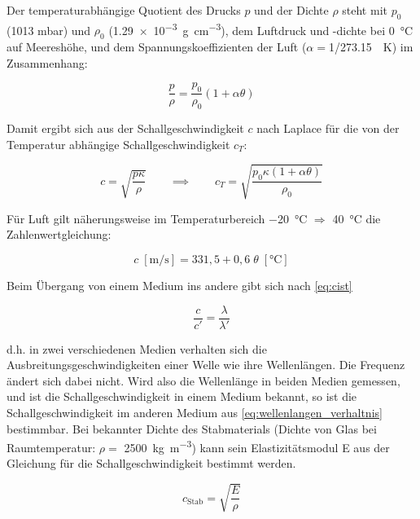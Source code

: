 \documentclass[11pt]{scrartcl}
\begin{document}
Der temperaturabhängige Quotient des Drucks $p$ und 
der Dichte $\rho$ steht mit $p_0$ (1013 mbar)
und $\rho_0$ (\SI{1.29e-3}{\gram\per\cm\cubed}), dem Luftdruck und -dichte 
bei \SI{0}{\celsius} auf Meereshöhe, und  dem
Spannungskoeffizienten der Luft ($\alpha=$\SI{1/273.15}{\per\kelvin}) 
im Zusammenhang:

\begin{equation}
    \frac{p}{\rho}=\frac{p_0}{\rho_0}(1+\alpha \theta)
\end{equation}

Damit ergibt sich aus der Schallgeschwindigkeit $c$ nach Laplace für 
die von der Temperatur
abhängige Schallgeschwindigkeit $c_T$:

\begin{equation}
    c = \sqrt{\frac{p\kappa}{\rho}} \qquad \implies \qquad c_T = \sqrt{\frac{p_0\kappa(1+\alpha \theta)}{\rho_0}} \label{eq:kappa_c}
\end{equation}

Für Luft gilt näherungsweise im Temperaturbereich \SI{-20}{\celsius} 
$\Rightarrow$ \SI{40}{\celsius} die Zahlenwertgleichung:

\begin{equation}
    c \; [\si{\meter\per\second}] = 331,5 + 0,6 \; \theta \; [\si{\celsius}] 
\end{equation}

Beim Übergang von einem Medium ins andere gibt sich nach \autoref{eq:cist}

\begin{equation}
    \frac{c}{c'}=\frac{\lambda}{\lambda'} \label{eq:wellenlangen_verhaltnis}
\end{equation}


d.h. in zwei verschiedenen Medien verhalten sich die 
Ausbreitungsgeschwindigkeiten einer Welle wie ihre Wellenlängen.
Die Frequenz ändert sich dabei nicht. Wird also die Wellenlänge in
beiden Medien gemessen, und ist die Schallgeschwindigkeit in einem Medium 
bekannt, so ist die Schallgeschwindigkeit im anderen Medium aus 
\autoref{eq:wellenlangen_verhaltnis} bestimmbar.
Bei bekannter Dichte des Stabmaterials (Dichte von Glas bei Raumtemperatur: 
$\rho =$ \SI{2500}{\kilogram\per\meter\cubed}) kann sein Elastizitätsmodul E aus 
der Gleichung für die Schallgeschwindigkeit bestimmt werden.

\begin{equation}
    c_{\text{Stab}} = \sqrt{\frac{E}{\rho}} \label{eq:stab_E} 
\end{equation}
\end{document}
